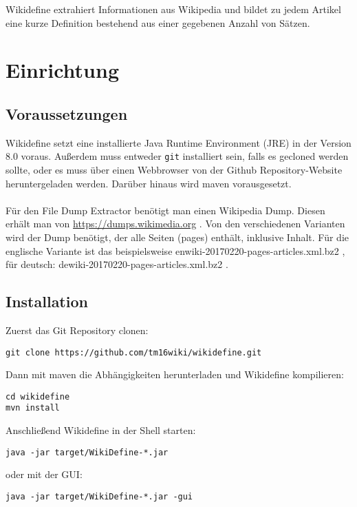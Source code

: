 \documentclass[12pt]{article}
\begin{document}
\maketitle

Wikidefine extrahiert Informationen aus Wikipedia und bildet zu jedem Artikel eine kurze Definition bestehend aus einer gegebenen Anzahl von S\"atzen.

\section{Einrichtung}

\subsection{Voraussetzungen}
Wikidefine setzt eine installierte Java Runtime Environment (JRE) in der Version 8.0 voraus. Außerdem muss entweder \texttt{git} installiert sein, falls es gecloned werden sollte, oder es muss \"uber einen Webbrowser von der Github Repository-Website heruntergeladen werden. Dar\"uber hinaus wird maven vorausgesetzt. \\\\
F\"ur den File Dump Extractor ben\"otigt man einen Wikipedia Dump. Diesen erh\"alt man von \url{https://dumps.wikimedia.org} . Von den verschiedenen Varianten wird der Dump ben\"otigt, der alle Seiten (pages) enth\"alt, inklusive Inhalt. F\"ur die englische Variante ist das beispielsweise enwiki-20170220-pages-articles.xml.bz2 , f\"ur deutsch: dewiki-20170220-pages-articles.xml.bz2 .

\subsection{Installation}
Zuerst das Git Repository clonen:
\begin{lstlisting}
git clone https://github.com/tm16wiki/wikidefine.git
\end{lstlisting}

Dann mit maven die Abh\"angigkeiten herunterladen und Wikidefine kompilieren:
\begin{lstlisting}
cd wikidefine
mvn install
\end{lstlisting}

Anschlie\ss{}end Wikidefine in der Shell starten:
\begin{lstlisting}
java -jar target/WikiDefine-*.jar
\end{lstlisting}

oder mit der GUI:
\begin{lstlisting}
java -jar target/WikiDefine-*.jar -gui
\end{lstlisting}
\end{document}
